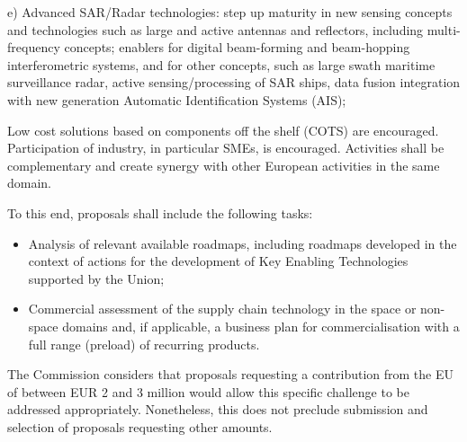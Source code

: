 e) Advanced SAR/Radar technologies: step up maturity in new sensing concepts and technologies such as large and active antennas and reflectors, including multi-frequency concepts; enablers for digital beam-forming and beam-hopping interferometric systems, and for other concepts, such as large swath maritime surveillance radar, active sensing/processing of SAR ships, data fusion integration with new generation Automatic Identification Systems (AIS);

Low cost solutions based on components off the shelf (COTS) are encouraged. Participation of industry, in particular SMEs, is encouraged. Activities shall be complementary and create synergy with other European activities in the same domain.

To this end, proposals shall include the following tasks:
\begin{itemize}
	\item Analysis of relevant available roadmaps, including roadmaps developed in the context of actions for the development of Key Enabling Technologies supported by the Union;
	\item Commercial assessment of the supply chain technology in the space or non-space domains and, if applicable, a business plan for commercialisation with a full range (preload) of recurring products.
\end{itemize}

The Commission considers that proposals requesting a contribution from the EU of between EUR 2 and 3 million would allow this specific challenge to be addressed appropriately. Nonetheless, this does not preclude submission and selection of proposals requesting other amounts.
